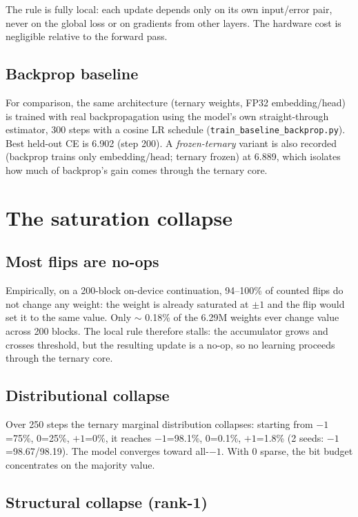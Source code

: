 \documentclass{article} %
\begin{document}
The rule is fully local: each update depends only on its own input/error pair, never on the global loss or on gradients from other layers. The hardware cost is negligible relative to the forward pass.

\subsection{Backprop baseline}
\label{sec:backprop}

For comparison, the same architecture (ternary weights, FP32 embedding/head) is trained with real backpropagation using the model's own straight-through estimator, 300 steps with a cosine LR schedule (\texttt{train\_baseline\_backprop.py}). Best held-out CE is 6.902 (step 200). A \emph{frozen-ternary} variant is also recorded (backprop trains only embedding/head; ternary frozen) at 6.889, which isolates how much of backprop's gain comes through the ternary core.

\section{The saturation collapse}
\label{sec:collapse}

\subsection{Most flips are no-ops}
\label{sec:noops}

Empirically, on a 200-block on-device continuation, 94--100\% of counted flips do not change any weight: the weight is already saturated at $\pm1$ and the flip would set it to the same value. Only $\sim$ 0.18\% of the 6.29M weights ever change value across 200 blocks. The local rule therefore stalls: the accumulator grows and crosses threshold, but the resulting update is a no-op, so no learning proceeds through the ternary core.

\subsection{Distributional collapse}
\label{sec:dist}

Over 250 steps the ternary marginal distribution collapses: starting from $-1$=75\%, $0$=25\%, $+1$=0\%, it reaches $-1$=98.1\%, $0$=0.1\%, $+1$=1.8\% (2 seeds: $-1$=98.67/98.19). The model converges toward all-$-1$. With $0$ sparse, the bit budget concentrates on the majority value.

\subsection{Structural collapse (rank-1)}
\label{sec:rank}
\end{document}

